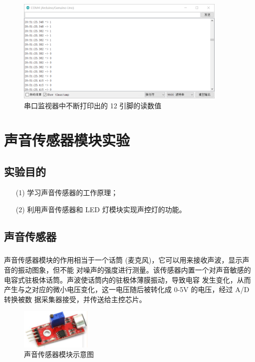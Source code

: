 \documentclass[UTF8, oneside]{ctexbook}
\begin{document}
\begin{figure}[h]
    \centering
    \includegraphics[width=0.9\textwidth]{./result/sensor/20/result1.png}
    \caption{串口监视器中不断打印出的 12 引脚的读数值}
    \label{s20_2}
\end{figure}

\chapter{声音传感器模块实验}
\section{实验目的}
\begin{itemize}
    \item[(1)] 学习声音传感器的工作原理；
    \item[(2)] 利用声音传感器和 LED 灯模块实现声控灯的功能。
\end{itemize}

\section{声音传感器}
\paragraph{}
声音传感器模块的作用相当于一个话筒 (麦克风)，它可以用来接收声波，显示声音的振动图象，但不能
对噪声的强度进行测量。该传感器内置一个对声音敏感的电容式驻极体话筒。声波使话筒内的驻极体薄膜振动，导致电容
发生变化，从而产生与之对应的微小电压变化，这一电压随后被转化成 0-5V 的电压，经过 A/D 转换被数
据采集器接受，并传送给主控芯片。

\begin{figure}[h]
    \centering
    \includegraphics[width=0.3\textwidth]{./result/sensor/21/sensor.png}
    \caption{声音传感器模块示意图}
    \label{21_sensor}
\end{figure}
\end{document}
